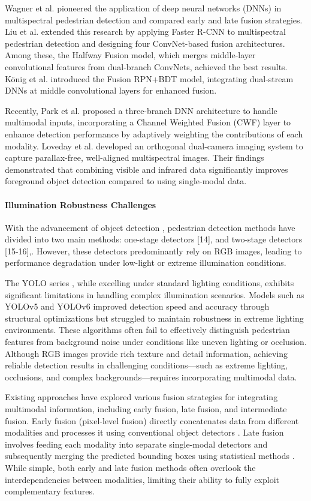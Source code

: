 Wagner et al. \cite{8} pioneered the application of deep neural networks (DNNs) in multispectral pedestrian detection and compared early and late fusion strategies. Liu et al. \cite{9} extended this research by applying Faster R-CNN  \cite{10} to multispectral pedestrian detection and designing four ConvNet-based fusion architectures. Among these, the Halfway Fusion model, which merges middle-layer convolutional features from dual-branch ConvNets, achieved the best results. König et al. \cite{11} introduced the Fusion RPN+BDT model, integrating dual-stream DNNs at middle convolutional layers for enhanced fusion.


Recently, Park et al.  \cite{12} proposed a three-branch DNN architecture to handle multimodal inputs, incorporating a Channel Weighted Fusion (CWF) layer to enhance detection performance by adaptively weighting the contributions of each modality. Loveday et al.  \cite{13} developed an orthogonal dual-camera imaging system to capture parallax-free, well-aligned multispectral images. Their findings demonstrated that combining visible and infrared data significantly improves foreground object detection compared to using single-modal data.
\paragraph{Illumination Robustness Challenges}
With the advancement of object detection \cite{zhang2024meddet,cai2024medical,cai2024msdet}, pedestrian detection methods have divided into two main methods: one-stage detectors [14], and two-stage detectors [15-16],. However, these detectors predominantly rely on RGB images, leading to performance degradation under low-light or extreme illumination conditions.


The YOLO series \cite{6}, while excelling under standard lighting conditions, exhibits significant limitations in handling complex illumination scenarios. Models such as YOLOv5 and YOLOv6 improved detection speed and accuracy through structural optimizations but struggled to maintain robustness in extreme lighting environments. These algorithms often fail to effectively distinguish pedestrian features from background noise under conditions like uneven lighting or occlusion. Although RGB images provide rich texture and detail information, achieving reliable detection results in challenging conditions—such as extreme lighting, occlusions, and complex backgrounds—requires incorporating multimodal data.

Existing approaches have explored various fusion strategies for integrating multimodal information, including early fusion, late fusion, and intermediate fusion. Early fusion (pixel-level fusion) directly concatenates data from different modalities and processes it using conventional object detectors \cite{5,15,17}. Late fusion involves feeding each modality into separate single-modal detectors and subsequently merging the predicted bounding boxes using statistical methods \cite{18,19,20}. While simple, both early and late fusion methods often overlook the interdependencies between modalities, limiting their ability to fully exploit complementary features.

